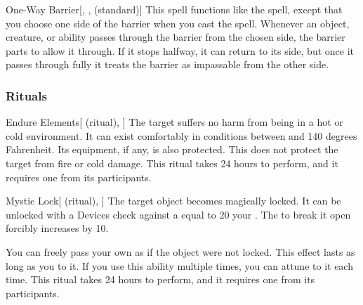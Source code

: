 \lowercase{\hypertarget{spell:One-Way Barrier}{}}\label{spell:One-Way Barrier}
\begin{freeability}[Rank 7]{\hypertarget{spell:One-Way Barrier}{One-Way Barrier}}[, ,  (standard)]
\targetrule
This spell functions like the  spell, except that you choose one side of the barrier when you cast the spell.
Whenever an object, creature, or ability passes through the barrier from the chosen side, the barrier parts to allow it through.
If it stops halfway, it can return to its side, but once it passes through fully it treats the barrier as impassable from the other side.

\end{freeability}
\vspace{0.25em}



\subsubsection{Rituals}


\lowercase{\hypertarget{spell:Endure Elements}{}}\label{spell:Endure Elements}
\begin{attuneability}[Rank 1]{\hypertarget{spell:Endure Elements}{Endure Elements}}[ (ritual), ]
The target suffers no harm from being in a hot or cold environment.
It can exist comfortably in conditions between  and 140 degrees Fahrenheit.
Its equipment, if any, is also protected.
This does not protect the target from fire or cold damage.
This ritual takes 24 hours to perform, and it requires one  from its participants.
\end{attuneability}
\vspace{0.25em}



\lowercase{\hypertarget{spell:Mystic Lock}{}}\label{spell:Mystic Lock}
\begin{attuneability}[Rank 3]{\hypertarget{spell:Mystic Lock}{Mystic Lock}}[ (ritual), ]
The target object becomes magically locked.
It can be unlocked with a Devices check against a  equal to 20 \add your .
The  to break it open forcibly increases by 10.

You can freely pass your own  as if the object were not locked.
This effect lasts as long as you  to it.
If you use this ability multiple times, you can attune to it each time.
This ritual takes 24 hours to perform, and it requires one  from its participants.
\end{attuneability}
\vspace{0.25em}



